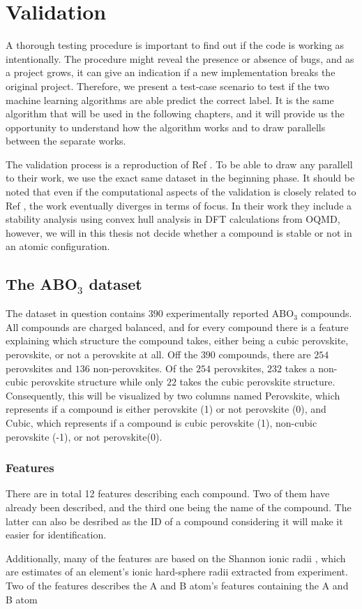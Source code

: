 \chapter{Validation}

A thorough testing procedure is important to find out if the code is working as intentionally. The procedure might reveal the presence or absence of bugs, and as a project grows, it can give an indication if a new implementation breaks the original project. Therefore, we present a test-case scenario to test if the two machine learning algorithms are able predict the correct label. It is the same algorithm that will be used in the following chapters, and it will provide us the opportunity to understand how the algorithm works and to draw parallells between the separate works.

The validation process is a reproduction of Ref \cite{Balachandran2018}. To be able to draw any parallell to their work, we use the exact same dataset in the beginning phase. It should be noted that even if the computational aspects of the validation is closely related to Ref \cite{Balachandran2018}, the work eventually diverges in terms of focus. In their work they include a stability analysis using convex hull analysis in DFT calculations from OQMD, however, we will in this thesis not decide whether a compound is stable or not in an atomic configuration.

\section{The ABO$_3$ dataset}

The dataset in question contains $390$ experimentally reported ABO$_3$ compounds. All compounds are charged balanced, and for every compound there is a feature explaining which structure the compound takes, either being a cubic perovskite, perovskite, or not a perovskite at all. Off the $390$ compounds, there are $254$ perovskites and $136$ non-perovskites. Of the $254$ perovskites, $232$ takes a non-cubic perovskite structure while only $22$ takes the cubic perovskite structure. Consequently, this will be visualized by two columns named Perovskite, which represents if a compound is either perovskite (1) or not perovskite (0), and Cubic, which represents if a compound is cubic perovskite (1), non-cubic perovskite (-1), or not perovskite(0).

\subsection{Features}

There are in total 12 features describing each compound. Two of them have already been described, and the third one being the name of the compound. The latter can also be desribed as the ID of a compound considering it will make it easier for identification.

Additionally, many of the features are based on the Shannon ionic radii \cite{Shannon1976}, which are estimates of an element's ionic hard-sphere radii extracted from experiment. Two of the features describes the A and B atom's features containing the A and B atom
